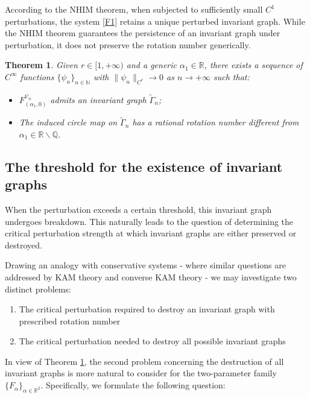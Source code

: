 \documentclass{amsart}
\newcommand{\R}{\mathbb{R}}
\newcommand{\al}{\alpha}
\newtheorem{Theorem}{Theorem}
\theoremstyle{definition}
\begin{document}
 According to the NHIM theorem, when subjected to sufficiently small $C^1$ perturbations, the system \eqref{F1} retains a unique perturbed invariant graph. While the NHIM theorem guarantees the persistence of an invariant graph under perturbation, it does not preserve the rotation number generically.
\begin{Theorem}\label{Mt3}
Given $r \in [1,+\infty)$ and a generic $\alpha_1 \in \mathbb{R}$, there exists a sequence of $C^\infty$ functions $\{\psi_n\}_{n \in \mathbb{N}}$ with $\|\psi_n\|_{C^r} \to 0$ as $n \to +\infty$ such that:
\begin{itemize}
    \item $F^{\psi_n}_{(\alpha_1,0)}$ admits an invariant graph $\tilde{\Gamma}_n$;
    \item The induced circle map on $\tilde{\Gamma}_n$ has a rational rotation number different from $\alpha_1\in\R\backslash\mathbb{Q}$.
\end{itemize}
\end{Theorem}



 \vspace{1em}

\subsection{The threshold for the existence of invariant graphs}


When the perturbation exceeds a certain threshold, this invariant graph undergoes breakdown. This naturally leads to the  question of determining the critical perturbation strength at which invariant graphs are either preserved or destroyed.

Drawing an analogy with conservative systems - where similar questions are addressed by KAM theory and converse KAM theory - we may investigate two distinct problems:
\begin{enumerate}
    \item [(1)] The critical perturbation required to destroy an invariant graph with prescribed rotation number
    \item [(2)] The critical perturbation needed to destroy all possible invariant graphs
\end{enumerate}

In view of Theorem \ref{Mt3},
 the second problem concerning the destruction of all invariant graphs is more natural to consider for the two-parameter family $\{F_{\al}\}_{\alpha\in\mathbb{R}^2}$. Specifically, we formulate the following question:
\end{document}
